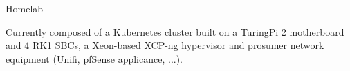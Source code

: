 

\begin{cventries}

  \cventry
    {Homelab} %
    {} %
    {} %
    {} %
    {
      \begin{cvitems} %
        \item {Currently composed of a Kubernetes cluster built on a TuringPi 2 motherboard and 4 RK1 SBCs, a Xeon-based XCP-ng hypervisor and prosumer network equipment (Unifi, pfSense applicance, ...).}
      \end{cvitems}
    }

\end{cventries}

